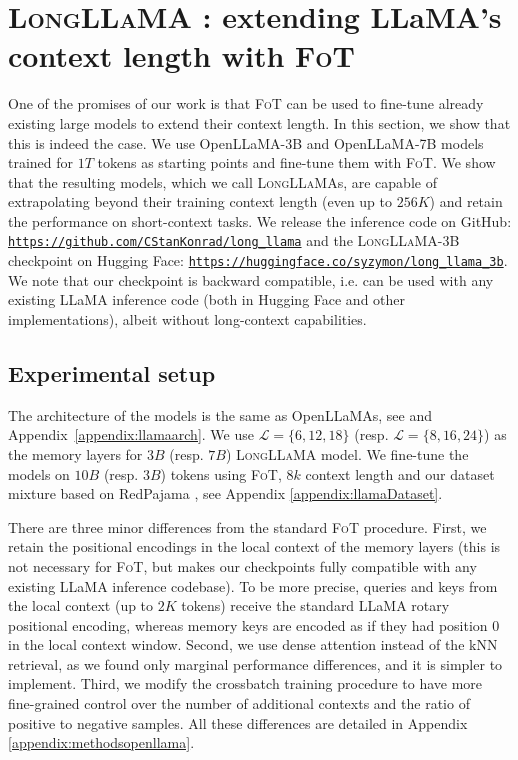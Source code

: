 \section{\textsc{LongLLaMA} \raisebox{-2pt}: extending LLaMA's context length with \textsc{FoT}}\label{sec:longLama}
One of the promises of our work is that \textsc{FoT} can be used to fine-tune already existing large models to extend their context length. In this section, we show that this is indeed the case. We use \mbox{OpenLLaMA-3B} and OpenLLaMA-7B models trained for $1T$ tokens as starting points and fine-tune them with \textsc{FoT}. We show that the resulting models, which we call \textsc{LongLLaMA}s, are capable of extrapolating beyond their training context length (even up to $256K$) and retain the performance on short-context tasks. We release the {inference} code on GitHub: \href{https://github.com/CStanKonrad/long_llama}{\texttt{https://github.com/CStanKonrad/long\_llama}} and the \textsc{LongLLaMA}{-3B} checkpoint on Hugging Face: \href{https://huggingface.co/syzymon/long_llama_3b}{\texttt{https://huggingface.co/syzymon/long\_llama\_3b}}. We note that our checkpoint is backward compatible, i.e. can be used with any existing LLaMA inference code (both in Hugging Face and other implementations), albeit without long-context capabilities. 

\subsection{Experimental setup}\label{sec:llama_exp_setup}
 The architecture of the models is the same as OpenLLaMAs, see \cite{openlm2023openllama} {and Appendix~\ref{appendix:llamaarch}}. We use $\mathcal{L} = \{6, 12, 18\}$ (resp.  $\mathcal{L} = \{8, 16, 24\}$) as the memory layers for $3B$ (resp. $7B$) \textsc{LongLLaMA} model. We fine-tune the models on $10B$ (resp. $3B$) tokens using \textsc{FoT}, $8k$ context length and our dataset mixture based on RedPajama \citep{together2023redpajama}, see Appendix \ref{appendix:llamaDataset}.

 There are three minor differences from the standard \textsc{FoT} procedure. First, we retain the positional encodings in the local context of the memory layers (this is not necessary for \textsc{FoT}, but makes our checkpoints fully compatible with any existing LLaMA inference codebase). To be more precise, queries and keys from the local context (up to $2K$ tokens) receive the standard LLaMA rotary positional encoding, whereas memory keys are encoded as if they had position 0 in the local context window. Second, we use dense attention instead of the kNN retrieval, as we found only marginal performance differences, and it is simpler to implement. Third, we modify the crossbatch training procedure to have more fine-grained control over the number of additional contexts and the ratio of positive to negative samples. All these differences are detailed in Appendix \ref{appendix:methodsopenllama}.

